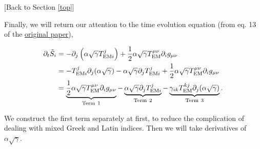 \documentclass[landscape,letterpaper,10pt,english]{article}
\begin{document}
\[\label{step7}\]

{[}Back to Section \ref{top}{]}

Finally, we will return our attention to the time evolution equation
(from eq. 13 of the \href{https://arxiv.org/pdf/1704.00599.pdf}{original
paper}),

\begin{align}
\partial_t \tilde{S}_i &= - \partial_j \left( \alpha \sqrt{\gamma} T^j_{{\rm EM} i} \right) + \frac{1}{2} \alpha \sqrt{\gamma} T^{\mu \nu}_{\rm EM} \partial_i g_{\mu \nu} \\
                       &= -T^j_{{\rm EM} i} \partial_j (\alpha \sqrt{\gamma}) - \alpha \sqrt{\gamma} \partial_j T^j_{{\rm EM} i} + \frac{1}{2} \alpha \sqrt{\gamma} T^{\mu \nu}_{\rm EM} \partial_i g_{\mu \nu} \\
                       &= \underbrace{\frac{1}{2} \alpha \sqrt{\gamma} T^{\mu \nu}_{\rm EM} \partial_i g_{\mu \nu}}_{\rm Term\ 1} - \underbrace{\alpha \sqrt{\gamma} \partial_j T^j_{{\rm EM} i}}_{\rm Term\ 2} - \underbrace{\gamma_{ik} T^{kj}_{\rm EM} \partial_j (\alpha \sqrt{\gamma})}_{\rm Term\ 3} .
\end{align}

We construct the first term separately at first, to reduce the
complication of dealing with mixed Greek and Latin indices. Then we will
take derivatives of \(\alpha \sqrt{\gamma}\).
\end{document}
